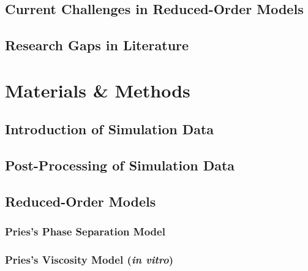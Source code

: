 \documentclass[a4paper, 11pt]{article}
\numberwithin{figure}{subsection}
\numberwithin{table}{subsection}
\begin{document}
\subsection{Current Challenges in Reduced-Order Models}
\label{CurrentChallenges}


\subsection{Research Gaps in Literature}
\label{MissingGaps}



\newpage
\section{Materials \& Methods}


\bigskip

\subsection{Introduction of Simulation Data}
\label{GenerationOfSimulationData}


\subsection{Post-Processing of Simulation Data}
\label{Post_Processing}

\bigskip

\subsection{Reduced-Order Models}
\label{Reduced_Order_Models}
\subsubsection{Pries's Phase Separation Model}

\bigskip

\subsubsection{Pries's Viscosity Model (\textit{in vitro})}

\bigskip
\end{document}
